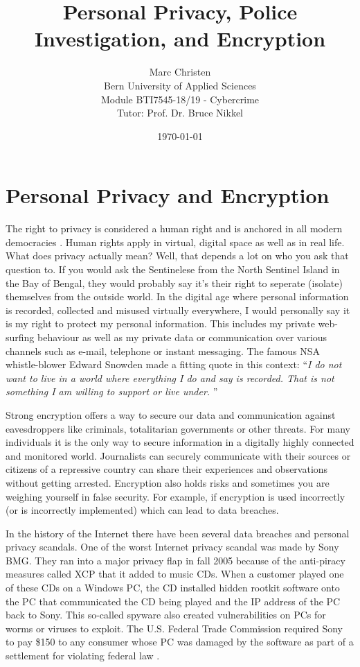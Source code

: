 \documentclass[a4paper, 11pt]{article}
\title{Personal Privacy, Police Investigation, and Encryption}
\author{Marc Christen  \\
	Bern University of Applied Sciences \\
	Module BTI7545-18/19 - Cybercrime \\
	Tutor: Prof. Dr. Bruce Nikkel \\
}
\date{\today}
\begin{document}
\maketitle
\noindent
\section*{Personal Privacy and Encryption}
The right to privacy is considered a human right and is anchored in all modern democracies \cite{ECHR}. Human rights apply in virtual, digital space as well as in real life. What does privacy actually mean? Well, that depends a lot on who you ask that question to. If you would ask the Sentinelese from the North Sentinel Island in the Bay of Bengal, they would probably say it's their right to seperate (isolate) themselves from the outside world. In the digital age where personal information is recorded, collected and misused virtually everywhere, I would personally say it is my right to protect my personal information. This includes my private web-surfing behaviour as well as my private data or communication over various channels such as e-mail, telephone or instant messaging. The famous NSA whistle-blower Edward Snowden made a fitting quote in this context: \enquote{\textit{I do not want to live in a world where everything I do and say is recorded. That is not something I am willing to support or live under.} \cite{SNOWDEN}}  
\par Strong encryption offers a way to secure our data and communication against eavesdroppers like criminals, totalitarian governments or other threats.
For many individuals it is the only way to secure information in a digitally highly connected and monitored world. Journalists can securely communicate with their sources or citizens of a repressive country can share their experiences and observations without getting arrested.
Encryption also holds risks and sometimes you are weighing yourself in false security. For example, if encryption is used incorrectly (or is incorrectly implemented) which can lead to data breaches.
\par In the history of the Internet there have been several data breaches and personal privacy scandals. One of the worst Internet privacy scandal was made by Sony BMG. They ran into a major privacy flap in fall 2005 because of the anti-piracy measures called XCP that it added to music CDs. When a customer played one of these CDs on a Windows PC, the CD installed hidden rootkit software onto the PC that communicated the CD being played and the IP address of the PC back to Sony. This so-called spyware also created vulnerabilities on PCs for worms or viruses to exploit. The U.S. Federal Trade Commission required Sony to pay \$150 to any consumer whose PC was damaged by the software as part of a settlement for violating federal law \cite{SONY}.
\end{document}
